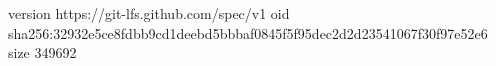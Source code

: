 version https://git-lfs.github.com/spec/v1
oid sha256:32932e5ce8fdbb9cd1deebd5bbbaf0845f5f95dec2d2d23541067f30f97e52e6
size 349692
